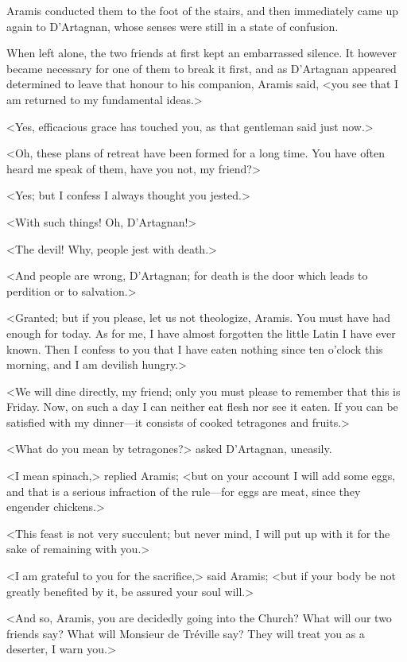 Aramis conducted them to the foot of the stairs, and then immediately came up again to D'Artagnan, whose senses were still in a state of confusion. 

When left alone, the two friends at first kept an embarrassed silence. It however became necessary for one of them to break it first, and as D'Artagnan appeared determined to leave that honour to his companion, Aramis said, <you see that I am returned to my fundamental ideas.> 

<Yes, efficacious grace has touched you, as that gentleman said just now.> 

<Oh, these plans of retreat have been formed for a long time. You have often heard me speak of them, have you not, my friend?> 

<Yes; but I confess I always thought you jested.> 

<With such things! Oh, D'Artagnan!> 

<The devil! Why, people jest with death.> 

<And people are wrong, D'Artagnan; for death is the door which leads to perdition or to salvation.> 

<Granted; but if you please, let us not theologize, Aramis. You must have had enough for today. As for me, I have almost forgotten the little Latin I have ever known. Then I confess to you that I have eaten nothing since ten o'clock this morning, and I am devilish hungry.> 

<We will dine directly, my friend; only you must please to remember that this is Friday. Now, on such a day I can neither eat flesh nor see it eaten. If you can be satisfied with my dinner—it consists of cooked tetragones and fruits.> 

<What do you mean by tetragones?> asked D'Artagnan, uneasily. 

<I mean spinach,> replied Aramis; <but on your account I will add some eggs, and that is a serious infraction of the rule—for eggs are meat, since they engender chickens.> 

<This feast is not very succulent; but never mind, I will put up with it for the sake of remaining with you.> 

<I am grateful to you for the sacrifice,> said Aramis; <but if your body be not greatly benefited by it, be assured your soul will.> 

<And so, Aramis, you are decidedly going into the Church? What will our two friends say? What will Monsieur de Tréville say? They will treat you as a deserter, I warn you.> 

